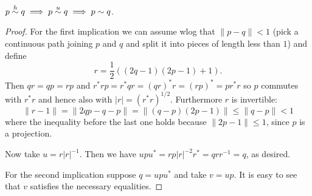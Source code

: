 \begin{proposition}
 $p\stackrel{h}{\sim} q\implies p\stackrel{u}{\sim} q\implies p\sim q$.
\end{proposition}
\begin{proof}
 For the first implication we can assume wlog that $\|p-q\|<1$ (pick a continuous path joining $p$ and $q$ and split it into pieces of length less than $1$) and define $$r=\frac12((2q-1)(2p-1)+1).$$ Then $qr=qp=rp$ and $r^\ast rp=r^\ast qr=(qr)^\ast r=(rp)^\ast=pr^\ast r$ so $p$ commutes with $r^\ast r$ and hence also with $|r|=(r^\ast r)^{1/2}$. Furthermore $r$ is invertible:
 $$\|r-1\|=\|2qp-q-p\|=\|(q-p)(2p-1)\|\leq\|q-p\|<1$$
 where the inequality before the last one holds because $\|2p-1\|\leq 1$, since $p$ is a projection.
 
 \noindent Now take $u=r|r|^{-1}$. Then we have $upu^\ast=rp|r|^{-2}r^\ast=qrr^{-1}=q$, as desired.
 
 \noindent For the second implication suppose $q=upu^\ast$ and take $v=up$. It is easy to see that $v$ satisfies the necessary equalities.
\end{proof}

